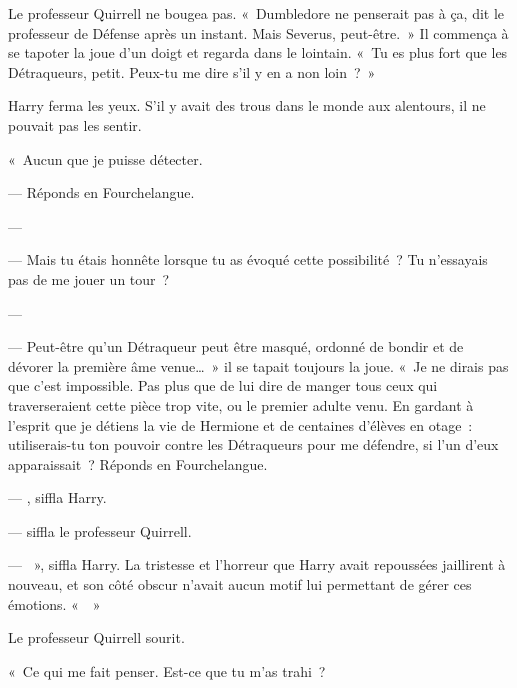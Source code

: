 Le professeur Quirrell ne bougea pas. «~Dumbledore ne penserait pas à ça, dit le professeur de Défense après un instant. Mais Severus, peut-être.~» Il commença à se tapoter la joue d'un doigt et regarda dans le lointain. «~Tu es plus fort que les Détraqueurs, petit. Peux-tu me dire s'il y en a non loin~?~»

Harry ferma les yeux. S'il y avait des trous dans le monde aux alentours, il ne pouvait pas les sentir.

«~Aucun que je puisse détecter.

--- Réponds en Fourchelangue.

--- 

--- Mais tu étais honnête lorsque tu as évoqué cette possibilité~? Tu n'essayais pas de me jouer un tour~?

--- 

--- Peut-être qu'un Détraqueur peut être masqué, ordonné de bondir et de dévorer la première âme venue…~» il se tapait toujours la joue. «~Je ne dirais pas que c'est impossible. Pas plus que de lui dire de manger tous ceux qui traverseraient cette pièce trop vite, ou le premier adulte venu. En gardant à l'esprit que je détiens la vie de Hermione et de centaines d'élèves en otage~: utiliserais-tu ton pouvoir contre les Détraqueurs pour me défendre, si l'un d'eux apparaissait~? Réponds en Fourchelangue.

--- , siffla Harry.

---  siffla le professeur Quirrell. 

--- ~», siffla Harry. La tristesse et l'horreur que Harry avait repoussées jaillirent à nouveau, et son côté obscur n'avait aucun motif lui permettant de gérer ces émotions. «~~»

Le professeur Quirrell sourit.

«~Ce qui me fait penser. Est-ce que tu m'as trahi~?

